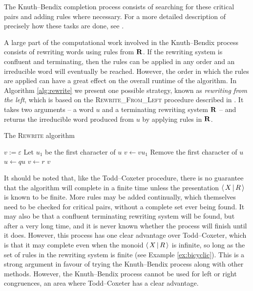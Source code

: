 The Knuth--Bendix completion process consists of searching for these critical
pairs and adding rules where necessary.  For a more detailed description of
precisely how these tasks are done, see \cite[\S 2.6]{sims}.

A large part of the computational work involved in the Knuth--Bendix process
consists of rewriting words using rules from $\mathbf{R}$.  If the rewriting system is
confluent and terminating, then the rules can be applied in any order and an
irreducible word will eventually be reached.  However, the order in which the
rules are applied can have a great effect on the overall runtime of the
algorithm.  In Algorithm \ref{alg:rewrite} we present one possible strategy,
known as \textit{rewriting from the left}, which is based on the
\textsc{Rewrite\_From\_Left} procedure described in \cite[\S 2.4]{sims}.  It
takes two arguments -- a word $u$ and a terminating rewriting system
$\mathbf{R}$ -- and returns the irreducible word produced from $u$ by applying rules in
$\mathbf{R}$.

\begin{algorithm}
\caption{The \textsc{Rewrite} algorithm}
\label{alg:rewrite}
\begin{algorithmic}[1]
\State $v := \varepsilon$
  \State Let $u_1$ be the first character of $u$
  \State $v \gets v u_1$
  \State Remove the first character of $u$
      \State $u \gets qu$
      \State $v \gets r$
      \State \Break
    \EndIf
  \EndFor
\EndWhile
\State \Return $v$
\EndProcedure
\end{algorithmic}
\end{algorithm}

It should be noted that, like the
Todd--Coxeter procedure, there is no guarantee that the algorithm will complete
in a finite time unless the presentation $\left\langle\,X\,\middle|\,R\,\right\rangle$ is known to be finite.
More rules may be added continually, which themselves need to
be checked for critical pairs, without a complete set ever being found.  It may
also be that a confluent terminating rewriting system will be found, but after a
very long time, and it is never known whether the process will finish until it
does.  However, this process has one clear advantage over Todd--Coxeter, which is
that it may complete even when the monoid $\left\langle\,X\,\middle|\,R\,\right\rangle$ is infinite, so long as
the set of rules in the rewriting system is finite
(see Example \ref{ex:bicyclic}).  This is a strong argument
in favour of trying the Knuth--Bendix process along with other methods.  However,
the Knuth--Bendix process cannot be used for left or right congruences, an area
where Todd--Coxeter has a clear advantage.

